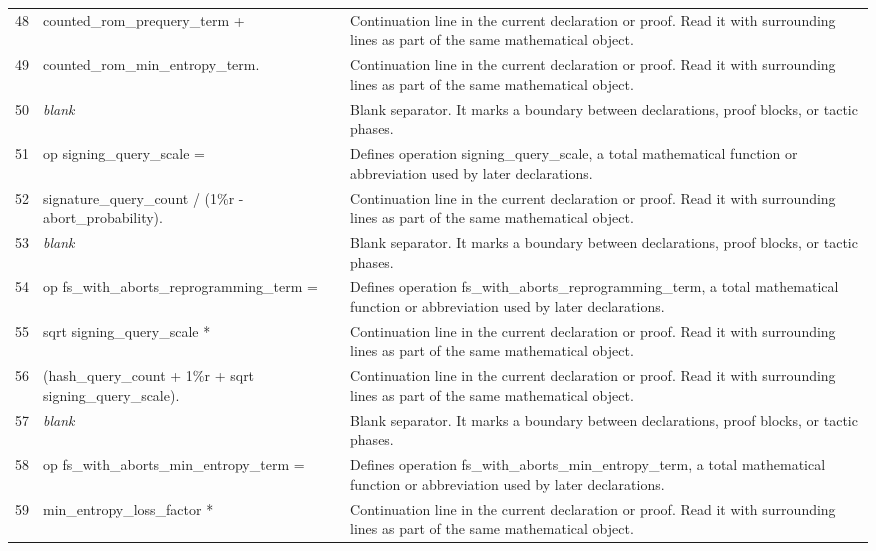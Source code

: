 \documentclass[10pt]{article}
\begin{document}
\begin{longtable}{r L{0.53\textwidth} L{0.37\textwidth}}
48 & {\ttfamily\scriptsize   counted\_rom\_prequery\_term +} & Continuation line in the current declaration or proof.  Read it with surrounding lines as part of the same mathematical object. \\
49 & {\ttfamily\scriptsize   counted\_rom\_min\_entropy\_term.} & Continuation line in the current declaration or proof.  Read it with surrounding lines as part of the same mathematical object. \\
50 & {\ttfamily\scriptsize \emph{blank}} & Blank separator.  It marks a boundary between declarations, proof blocks, or tactic phases. \\
51 & {\ttfamily\scriptsize op signing\_query\_scale =} & Defines operation signing\_query\_scale, a total mathematical function or abbreviation used by later declarations. \\
52 & {\ttfamily\scriptsize   signature\_query\_count / (1\%r - abort\_probability).} & Continuation line in the current declaration or proof.  Read it with surrounding lines as part of the same mathematical object. \\
53 & {\ttfamily\scriptsize \emph{blank}} & Blank separator.  It marks a boundary between declarations, proof blocks, or tactic phases. \\
54 & {\ttfamily\scriptsize op fs\_with\_aborts\_reprogramming\_term =} & Defines operation fs\_with\_aborts\_reprogramming\_term, a total mathematical function or abbreviation used by later declarations. \\
55 & {\ttfamily\scriptsize   sqrt signing\_query\_scale *} & Continuation line in the current declaration or proof.  Read it with surrounding lines as part of the same mathematical object. \\
56 & {\ttfamily\scriptsize     (hash\_query\_count + 1\%r + sqrt signing\_query\_scale).} & Continuation line in the current declaration or proof.  Read it with surrounding lines as part of the same mathematical object. \\
57 & {\ttfamily\scriptsize \emph{blank}} & Blank separator.  It marks a boundary between declarations, proof blocks, or tactic phases. \\
58 & {\ttfamily\scriptsize op fs\_with\_aborts\_min\_entropy\_term =} & Defines operation fs\_with\_aborts\_min\_entropy\_term, a total mathematical function or abbreviation used by later declarations. \\
59 & {\ttfamily\scriptsize   min\_entropy\_loss\_factor *} & Continuation line in the current declaration or proof.  Read it with surrounding lines as part of the same mathematical object. \\

\end{longtable}
\end{document}
